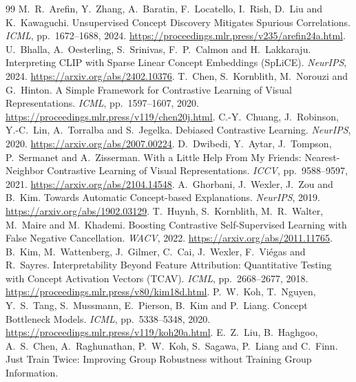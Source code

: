 \documentclass{article}
\begin{document}
\begingroup
\footnotesize
\setlength{\bibsep}{4pt plus 1pt}
\begin{thebibliography}{99}
M.~R.~Arefin, Y.~Zhang, A.~Baratin, F.~Locatello, I.~Rish, D.~Liu and K.~Kawaguchi.
Unsupervised Concept Discovery Mitigates Spurious Correlations.
\emph{ICML}, pp.~1672--1688, 2024.
\url{https://proceedings.mlr.press/v235/arefin24a.html}.
U.~Bhalla, A.~Oesterling, S.~Srinivas, F.~P.~Calmon and H.~Lakkaraju.
Interpreting CLIP with Sparse Linear Concept Embeddings (SpLiCE).
\emph{NeurIPS}, 2024. \url{https://arxiv.org/abs/2402.10376}.
T.~Chen, S.~Kornblith, M.~Norouzi and G.~Hinton.
A Simple Framework for Contrastive Learning of Visual Representations.
\emph{ICML}, pp.~1597--1607, 2020.
\url{https://proceedings.mlr.press/v119/chen20j.html}.
C.-Y.~Chuang, J.~Robinson, Y.-C.~Lin, A.~Torralba and S.~Jegelka.
Debiased Contrastive Learning. \emph{NeurIPS}, 2020.
\url{https://arxiv.org/abs/2007.00224}.
D.~Dwibedi, Y.~Aytar, J.~Tompson, P.~Sermanet and A.~Zisserman.
With a Little Help From My Friends: Nearest-Neighbor Contrastive Learning
of Visual Representations. \emph{ICCV}, pp.~9588--9597, 2021.
\url{https://arxiv.org/abs/2104.14548}.
A.~Ghorbani, J.~Wexler, J.~Zou and B.~Kim.
Towards Automatic Concept-based Explanations. \emph{NeurIPS}, 2019.
\url{https://arxiv.org/abs/1902.03129}.
T.~Huynh, S.~Kornblith, M.~R.~Walter, M.~Maire and M.~Khademi.
Boosting Contrastive Self-Supervised Learning with False Negative Cancellation.
\emph{WACV}, 2022. \url{https://arxiv.org/abs/2011.11765}.
B.~Kim, M.~Wattenberg, J.~Gilmer, C.~Cai, J.~Wexler, F.~Vi\'egas and R.~Sayres.
Interpretability Beyond Feature Attribution: Quantitative Testing with Concept Activation Vectors (TCAV).
\emph{ICML}, pp.~2668--2677, 2018. \url{https://proceedings.mlr.press/v80/kim18d.html}.
P.~W.~Koh, T.~Nguyen, Y.~S.~Tang, S.~Mussmann, E.~Pierson, B.~Kim and P.~Liang.
Concept Bottleneck Models. \emph{ICML}, pp.~5338--5348, 2020.
\url{https://proceedings.mlr.press/v119/koh20a.html}.
E.~Z.~Liu, B.~Haghgoo, A.~S.~Chen, A.~Raghunathan, P.~W.~Koh,
S.~Sagawa, P.~Liang and C.~Finn.
Just Train Twice: Improving Group Robustness without Training Group Information.

\end{thebibliography}
\end{document}
